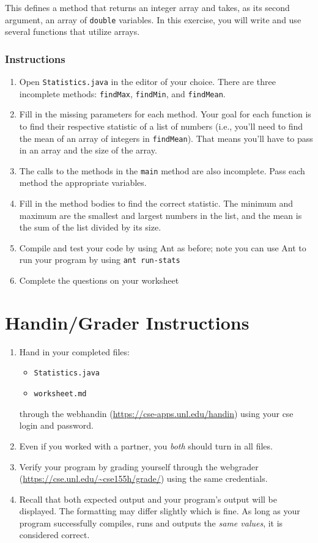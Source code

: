 \documentclass[12pt]{scrartcl}
\begin{document}
This defines a method that returns an integer array and takes, 
as its second argument, an array of \texttt{double} 
variables.  In this exercise, you will write and use several 
functions that utilize arrays.

\subsubsection*{Instructions}
\begin{enumerate}
  \item Open \texttt{Statistics.java} in the editor of your choice.  There 
	are three incomplete methods: \texttt{findMax}, \texttt{findMin}, 
	and \texttt{findMean}.  
  \item Fill in the missing parameters for each method.  Your goal for each function is 
  	to find their respective statistic of a list of numbers (i.e., you'll need to find the 
	mean of an array of integers in \texttt{findMean}).  That means you'll 
	have to pass in an array and the size of the array.
  \item The calls to the methods in the \texttt{main} method are also incomplete.  
	Pass each method the appropriate variables.
  \item Fill in the method bodies to find the correct statistic.  The minimum and maximum 
	are the smallest and largest numbers in the list, and the mean is the sum of the 
	list divided by its size.  
  \item Compile and test your code by using Ant as before; note you can use Ant to 
	run your program by using \texttt{ant run-stats}
  \item Complete the questions on your worksheet 
\end{enumerate}

\section{Handin/Grader Instructions}

\begin{enumerate}
  \item Hand in your completed files:
    \begin{itemize}
    \item \texttt{Statistics.java}
    \item \texttt{worksheet.md}
  \end{itemize}
  through the webhandin (\url{https://cse-apps.unl.edu/handin}) 
  using your cse login and password.  
  \item Even if you worked with a partner, you \emph{both} should
  turn in all files.
  \item Verify your program by grading yourself through the
  webgrader (\url{https://cse.unl.edu/~cse155h/grade/}) using the
  same credentials.
  \item Recall that both expected output and your program's output
  will be displayed.  The formatting may differ slightly which is fine.
  As long as your program successfully compiles, runs and outputs 
  the \emph{same values}, it is considered correct.
\end{enumerate}
	
\end{document}
